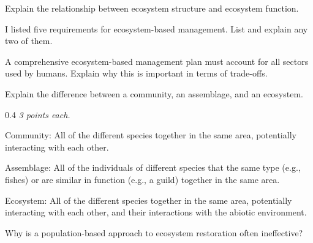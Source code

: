 \question[5]
Explain the relationship between ecosystem structure and ecosystem function.



\question[5]
I listed five requirements for ecosystem-based management. List and explain any two of them.



\question[5]
A comprehensive ecosystem-based management plan must account for all sectors used by humans. Explain why this is important in terms of trade-offs. %



\question[10]
Explain the difference between a community, an assemblage, and an ecosystem.

\begin{AnswerPage}{0.4\textheight}%
	\emph{3 points each.}
	
	\vspace*{\baselineskip}
	
	Community: All of the different species together in the same area, potentially interacting with each other.
	
	\vspace*{\baselineskip}
	
	Assemblage: All of the individuals of different species that the same type (e.g., fishes) or are similar in function (e.g., a guild) together in the same area.
	
	\vspace*{\baselineskip}
	
	Ecosystem: All of the different species together in the same area, potentially interacting with each other, and their interactions with the abiotic environment.
	
\end{AnswerPage}

\question[5]
Why is a population-based approach to ecosystem restoration often ineffective?

